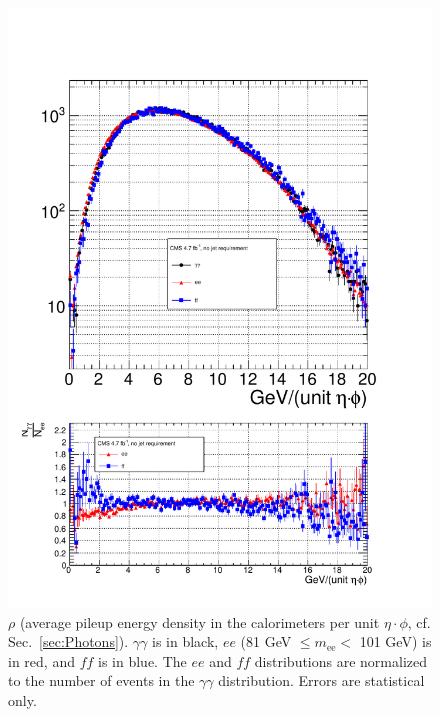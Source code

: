 \documentclass[dissertation_bw.tex]{subfiles}
\begin{document}
\begin{figure}
	\centering
	\includegraphics[scale=0.5]{hadronic_activity_rho}
	\caption{$\rho$ (average pileup energy density in the calorimeters per unit $\eta\cdot\phi$, cf. Sec.~\ref{sec:Photons}).  $\gamma\gamma$ is in black, $ee$ (81 GeV $\leq m_{\mathrm{ee}} <$ 101 GeV) is in red, and $\mathit{ff}$ is in blue.  The $ee$ and $\mathit{ff}$ distributions are normalized to the number of events in the $\gamma\gamma$ distribution.  Errors are statistical only.}
	\label{fig:hadronic_activity_rho}
\end{figure}
\end{document}
